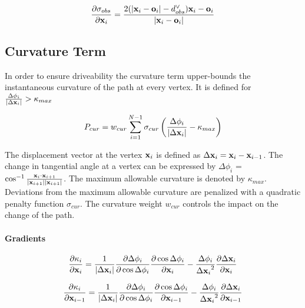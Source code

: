 \begin{equation}
\frac{\partial \sigma_{obs}}{\partial \mathbf{x}_i} = \frac{2(|\mathbf{x}_i-\mathbf{o}_i|-d_{obs}^{\lor})\mathbf{x}_i-\mathbf{o}_i}{|\mathbf{x}_i-\mathbf{o}_i|}
\end{equation}

\subsection{Curvature Term}
In order to ensure driveability the curvature term upper-bounds the instantaneous curvature of the path at every vertex. It is defined for $\frac{\Delta\phi_i}{|\Delta\mathbf{x}_i|} > \kappa_{max}$


\begin{equation}
P_{cur} = w_{cur} \displaystyle\sum_{i=1}^{N-1} \sigma_{cur}\left(\frac{\Delta\phi_i}{|\Delta\mathbf{x}_i|} - \kappa_{max}\right)
\end{equation}

The displacement vector at the vertex $\mathbf{x}_i$ is defined as $\Delta\mathbf{x}_i= \mathbf{x}_i - \mathbf{x}_{i-1}$. The change in tangential angle at a vertex can be expressed by $\Delta\phi_i$ = $\cos^{-1}\frac{\mathbf{x}_{i}\cdot\mathbf{x}_{i+1}}{|\mathbf{x}_{i+1}||\mathbf{x}_{i+1}| }$.  The maximum allowable curvature is denoted by $\kappa_{max}$. Deviations from the maximum allowable curvature are penalized with a quadratic penalty function $\sigma_{cur}$. The curvature weight $w_{cur}$  controls the impact on the change of the path.

\paragraph{Gradients}

\begin{equation}
\frac{\partial \kappa_i}{\partial \mathbf{x}_i} = \frac{1}{|\Delta\mathbf{x}_i|}\frac{\partial\Delta\phi_i}{\partial\cos\Delta\phi_i}\frac{\partial\cos\Delta\phi_i}{\partial\mathbf{x}_i}-\frac{\Delta\phi_i}{{\Delta\mathbf{x}_i}^2}\frac{\partial\Delta\mathbf{x}_i}{\partial\mathbf{x}_i}
\end{equation}

\begin{equation}
\frac{\partial \kappa_i}{\partial \mathbf{x}_{i-1}} = \frac{1}{|\Delta\mathbf{x}_i|}\frac{\partial\Delta\phi_i}{\partial\cos\Delta\phi_i}\frac{\partial\cos\Delta\phi_i}{\partial\mathbf{x}_{i-1}}-\frac{\Delta\phi_i}{{\Delta\mathbf{x}_i}^2}\frac{\partial\Delta\mathbf{x}_i}{\partial\mathbf{x}_{i-1}}
\end{equation}

